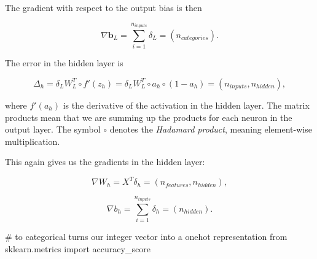 \documentclass[%
oneside,                 %
final,                   %
10pt]{article}
\begin{document}
The gradient with respect to the output bias is then  

$$ \nabla \bm{b}_{L} = \sum_{i=1}^{n_{inputs}} \delta_L = (n_{categories}) .$$  

The error in the hidden layer is  

$$ \Delta_h = \delta_L W_{L}^T \circ f'(z_{h}) = \delta_L W_{L}^T \circ a_{h} \circ (1 - a_{h}) = (n_{inputs}, n_{hidden}) ,$$  

where $f'(a_{h})$ is the derivative of the activation in the hidden layer. The matrix products mean
that we are summing up the products for each neuron in the output layer. The symbol $\circ$ denotes
the \emph{Hadamard product}, meaning element-wise multiplication.  

This again gives us the gradients in the hidden layer:  

$$ \nabla W_{h} = X^T \delta_h = (n_{features}, n_{hidden}) ,$$  

$$ \nabla b_{h} = \sum_{i=1}^{n_{inputs}} \delta_h = (n_{hidden}) .$$






































































\bpycod
# to categorical turns our integer vector into a onehot representation
from sklearn.metrics import accuracy_score
\end{document}
